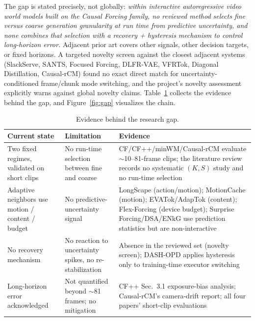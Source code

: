 \documentclass[11pt,a4paper]{article}
\begin{document}
The gap is stated precisely, not globally: \emph{within interactive autoregressive video world models built on the Causal Forcing family, no reviewed method selects fine versus coarse generation granularity at run time from predictive uncertainty, and none combines that selection with a recovery + hysteresis mechanism to control long-horizon error.} Adjacent prior art covers other signals, other decision targets, or fixed horizons. A targeted novelty screen against the closest adjacent systems (SlackServe, SANTS, Focused Forcing, DLFR-VAE, VFRTok, Diagonal Distillation, Causal-rCM) \parencite{xiaAdaptiveResourceManagement2026,sunSANTSStateAdaptiveScheduler2026,caiFocusedForcingContentAware2026,yuanDLFRVAEDynamicLatent2025,zhongVFRTokVariableFrame2025,liuStreamingAutoregressiveVideo2026,zhengCausalrCMUnifiedTeacherForcing2026} found no exact direct match for uncertainty-conditioned frame/chunk mode switching, and the project's novelty assessment explicitly warns against global novelty claims. Table~\ref{tab:gapevidence} collects the evidence behind the gap, and Figure~\ref{fig:gap} visualizes the chain.

\begin{table}[t]
\centering
\small
\renewcommand{\arraystretch}{1.3}
\begin{tabularx}{\textwidth}{>{\raggedright\arraybackslash}p{4.2cm} >{\raggedright\arraybackslash}X >{\raggedright\arraybackslash}X}
\toprule
\textbf{Current state} & \textbf{Limitation} & \textbf{Evidence} \\
\midrule
Two fixed regimes, validated on short clips & No run-time selection between fine and coarse & CF/CF++/minWM/Causal-rCM evaluate $\sim$10--81-frame clips; the literature review records no systematic $(K,S)$ study and no run-time selection \\
Adaptive neighbors use motion / content / budget & No predictive-uncertainty signal & LongScape (action/motion); MotionCache (motion); EVATok/AdapTok (content); Flex-Forcing (device budget); Surprise Forcing/DSA/ENkG use prediction statistics but are non-interactive \\
No recovery mechanism & No reaction to uncertainty spikes, no re-stabilization & Absence in the reviewed set (novelty screen); DASH-OPD applies hysteresis only to training-time executor switching \\
Long-horizon error acknowledged & Not quantified beyond $\sim$81 frames; no mitigation & CF++ Sec.~3.1 exposure-bias analysis; Causal-rCM's camera-drift report; all four papers' short-clip evaluations \\
\bottomrule
\end{tabularx}
\caption{Evidence behind the research gap.}
\label{tab:gapevidence}
\end{table}
\end{document}
